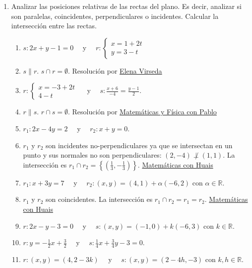 \documentclass[a4paper]{article}
\newcommand{\answer}{\item[**]}
\newcommand{\exercise}{\item}
\begin{document}
\begin{enumerate}
\begin{enumerate} [label=(\alph*)]
	\end{enumerate}

	\exercise Analizar las posiciones relativas de las rectas del plano. Es decir, analizar si son paralelas, coincidentes, perpendiculares o incidentes. Calcular la intersección entre las rectas.
	\begin{enumerate} [label=(\alph*)]
		
		\item $s: 2x+y-1=0$ ~~y~~ $r:\left\{\begin{matrix}x=1+2t \\ y=3-t\end{matrix}\right.$
		\answer $s \parallel r$. $s \cap r=\emptyset$.  Resolución por \href{https://youtu.be/cHsXMw3V4mQ}{Elena Virseda}

		\item $r:\left\{\begin{matrix}x=-3+2t \\ 4-t\end{matrix}\right.$ ~~y~~ $s:\displaystyle{\frac{x+6}{-4}}=\displaystyle{\frac{y-1}{2}}$.
		\answer $r \parallel s$. $r \cap s=\emptyset$. Resolución por \href{https://youtu.be/MPUh70MKVUY}{Matemáticas y Física con Pablo}

		\item $r_1: 2x-4y=2$ ~~y~~ $r_2: x+y=0$.
		\answer $r_1$ y $r_2$ son incidentes no-perpendiculares ya que se intersectan en un punto y sus normales no son perpendiculares: $(2,-4) \not\perp (1,1)$. La intersección es $r_1 \cap r_2=\left\{ \left(\frac{1}{3},-\frac{1}{3}\right)\right\}$. \href{https://youtu.be/LgIU8pd8DeM?t=97}{Matemáticas con Huais}

		\item $r_1: x+3y=7$ ~~y~~ $r_2: (x,y)=(4,1)+\alpha (-6,2)$ con $\alpha \in\mathbb{R}$.
		\answer $r_1$ y $r_2$ son coincidentes. La intersección es $r_1 \cap r_2=r_1=r_2$. \href{https://youtu.be/LgIU8pd8DeM?t=884}{Matemáticas con Huais}

		\item $r: 2x-y-3=0$ ~~y~~ $s: (x,y)=(-1,0)+ k (-6,3)$ con $k\in\mathbb{R}$.

		\item $r: y=-\frac{1}{2}x+\frac{3}{2}$ ~~y~~ $s: \frac{1}{4}x+\frac{3}{4}y-3=0$.

		\item $r: (x,y)=(4,2-3k)$ ~~y~~ $s: (x,y)=(2-4h,-3)$ con $k,h\in\mathbb{R}$.


\end{enumerate}
\end{enumerate}
\end{document}
